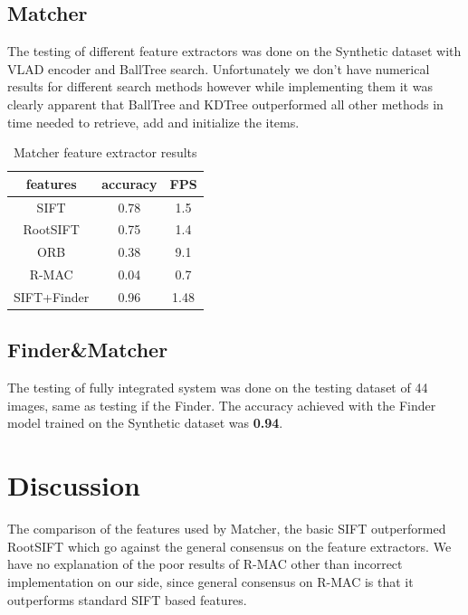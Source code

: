 \documentclass{article}
\begin{document}
\subsection{Matcher}

The testing of different feature extractors was done on the Synthetic dataset with VLAD encoder and BallTree search.
Unfortunately we don't have numerical results for different search methods however while implementing them it was clearly apparent that BallTree and KDTree outperformed all other methods in time needed to retrieve, add and initialize the items.

\begin{table}[H]
    \centering
    \begin{tabular}{ c|c c  } 
    features & accuracy & FPS \\ \hline \hline
    SIFT     & 0.78     & 1.5 \\ 
    RootSIFT & 0.75     & 1.4 \\ 
    ORB      & 0.38     & 9.1 \\
    R-MAC    & 0.04     & 0.7 \\ \hline
    SIFT+Finder & 0.96 & 1.48 \\
    \end{tabular}
    \caption{Matcher feature extractor results}
    \label{tab:2}
\end{table}

\subsection{Finder\&Matcher}

The testing of fully integrated system was done on the testing dataset of 44 images, same as testing if the Finder.
The accuracy achieved with the Finder model trained on the Synthetic dataset was \textbf{0.94}.

\section{Discussion}

The comparison of the features used by Matcher, the basic SIFT outperformed RootSIFT which go against the general consensus on the feature extractors.
We have no explanation of the poor results of R-MAC other than incorrect implementation on our side, since general consensus on R-MAC is that it outperforms standard SIFT based features.
\end{document}
